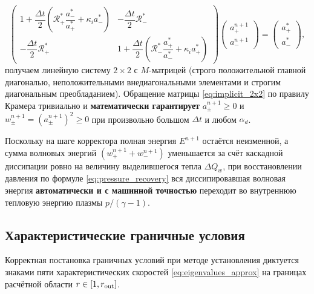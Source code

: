 \documentclass[11pt,a4paper]{article}
\begin{document}
\begin{enumerate}
\begin{equation}
\begin{pmatrix}
1 + \dfrac{\Delta t}{2}\left(\mathcal{R}_+^*\dfrac{a_-^*}{a_+^*} + \kappa_i a_-^*\right) & -\dfrac{\Delta t}{2}\mathcal{R}_-^* \\[10pt]
-\dfrac{\Delta t}{2}\mathcal{R}_+^* & 1 + \dfrac{\Delta t}{2}\left(\mathcal{R}_-^*\dfrac{a_+^*}{a_-^*} + \kappa_i a_+^*\right)
\end{pmatrix}
\begin{pmatrix}
a_+^{n+1} \\[8pt]
a_-^{n+1}
\end{pmatrix} =
\begin{pmatrix}
a_+^* \\[8pt]
a_-^*
\end{pmatrix},
\label{eq:implicit_2x2}
\end{equation}
получаем линейную систему $2 \times 2$ с $M$-матрицей (строго положительной главной диагональю, неположительными внедиагональными элементами и строгим диагональным преобладанием). Обращение матрицы \eqref{eq:implicit_2x2} по правилу Крамера тривиально и \textbf{математически гарантирует} $a_\pm^{n+1} \ge 0$ и $w_\pm^{n+1} = (a_\pm^{n+1})^2 \ge 0$ при произвольно большом $\Delta t$ и любом $\alpha_d$.
\end{enumerate}

Поскольку на шаге корректора полная энергия $E^{n+1}$ остаётся неизменной, а сумма волновых энергий $(w_+^{n+1} + w_-^{n+1})$ уменьшается за счёт каскадной диссипации ровно на величину выделившегося тепла $\Delta Q_w$, при восстановлении давления по формуле \eqref{eq:pressure_recovery} вся диссипировавшая волновая энергия \textbf{автоматически и с машинной точностью} переходит во внутреннюю тепловую энергию плазмы $p/(\gamma - 1)$.

\subsection{Характеристические граничные условия}

Корректная постановка граничных условий при методе установления диктуется знаками пяти характеристических скоростей \eqref{eq:eigenvalues_approx} на границах расчётной области $r \in [1, r_{\rm out}]$.
\end{document}
